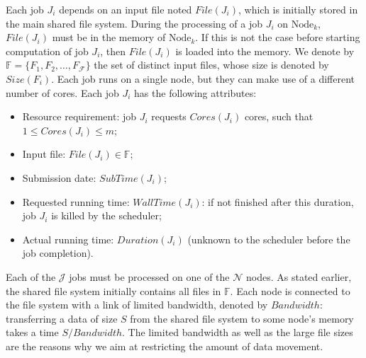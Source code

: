 \documentclass[conference]{IEEEtran}
\newcommand{\Node}[1]{\ensuremath{\mathrm{Node}_{#1}}\xspace}
\newcommand{\file}{\ensuremath{\mathit{File}}\xspace}
\newcommand{\size}{\ensuremath{\mathit{Size}}\xspace}
\newcommand{\duration}{\mathit{Duration}\xspace}
\newcommand{\bandwidth}{\mathit{Bandwidth}\xspace}
\newcommand{\core}{\mathit{Cores}\xspace}
\newcommand{\submissiontime}{\mathit{SubTime}\xspace}
\newcommand{\walltime}{\mathit{WallTime}\xspace}
\newcommand{\fileset}{\ensuremath{\mathbb{F}}\xspace}
\newcommand{\filenum}{\ensuremath{\mathcal{F}}\xspace}
\newcommand{\jobnum}{\ensuremath{\mathcal{J}}\xspace}
\newcommand{\nodenum}{\ensuremath{\mathcal{N}}\xspace}
\begin{document}
Each job $J_i$ depends on an input file noted $\file(J_i)$, which is
initially stored in the main shared file system.  During the
processing of a job $J_i$ on $\Node{k}$, $\file(J_i)$ must be in
the memory of $\Node{k}$. If this is not the case before starting
computation of job $J_i$, then $\file(J_i)$ is loaded into the
memory.  We denote by $\fileset = \{F_1, F_2, \ldots, F_\filenum\}$ the set
of distinct input files, whose size is denoted by $\size(F_i)$. Each
job runs on a single node, but they can make use of a different number
of cores.
Each job $J_i$ has the following attributes:
\begin{itemize}
\item Resource requirement: job $J_i$ requests $\core(J_i)$  cores, such that $1 \leq \core(J_i) \leq m$;
\item Input file: $\file(J_i) \in \fileset$;
\item Submission date: $\submissiontime(J_i)$;
\item Requested running time: $\walltime(J_i)$: if not
  finished after this duration, job $J_i$ is killed by the scheduler;
\item Actual running time: $\duration(J_i)$ (unknown to  the scheduler
  before the job completion).
\end{itemize}

Each of the $\jobnum$ jobs must be processed on one of the $\nodenum$ nodes.  As
stated earlier, the shared file system initially contains all files
in $\fileset$.  Each node is connected to the file system with a link
of limited bandwidth, denoted by $\bandwidth$: transferring a data of
size $S$ from the shared file system to some node's memory takes a
time $S/\bandwidth$.
The limited bandwidth
as well as the large file sizes are the reasons why we aim at
restricting the amount of data movement.
\end{document}
